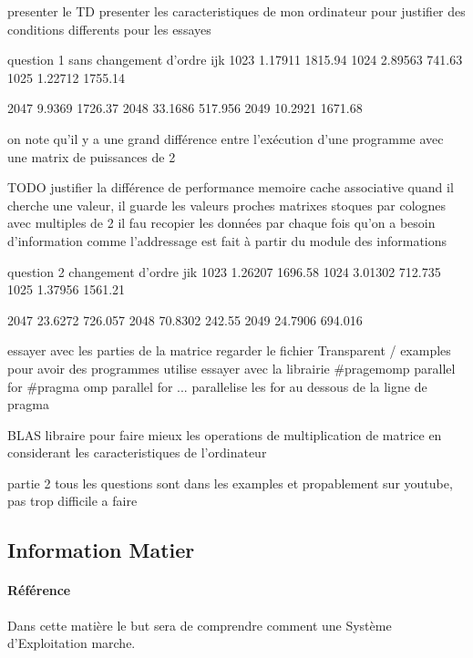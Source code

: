 \documentclass{article}
\begin{document}
presenter le TD
presenter les caracteristiques de mon ordinateur pour justifier des conditions differents pour les essayes

question 1
    sans changement d'ordre ijk
        1023 1.17911 1815.94
        1024 2.89563  741.63
        1025 1.22712 1755.14

        2047  9.9369 1726.37
        2048 33.1686 517.956
        2049 10.2921 1671.68

    on note qu'il y a une grand différence entre l'exécution d'une programme avec une matrix de puissances de 2

    TODO justifier la différence de performance
        memoire cache associative
        quand il cherche une valeur, il guarde les valeurs proches
        matrixes stoques par colognes
        avec multiples de 2 il fau recopier les données par chaque fois qu'on a besoin d'information
        comme l'addressage est fait à partir du module des informations 

question 2
    changement d'ordre jik
        1023 1.26207 1696.58
        1024 3.01302 712.735
        1025 1.37956 1561.21

        2047 23.6272 726.057
        2048 70.8302 242.55
        2049 24.7906 694.016
    
essayer avec les parties de la matrice
regarder le fichier Transparent / examples pour avoir des programmes utilise
essayer avec la librairie #pragemomp parallel for
#pragma omp parallel for ... parallelise les for au dessous de la ligne de pragma


BLAS libraire pour faire mieux les operations de multiplication de matrice en considerant les caracteristiques de l'ordinateur



partie 2
tous les questions sont dans les examples et propablement sur youtube, pas trop difficile a faire


\subsection{Information Matier}
\paragraph{Référence}Dans cette matière le but sera de comprendre comment une Système d'Exploitation marche.
\end{document}
